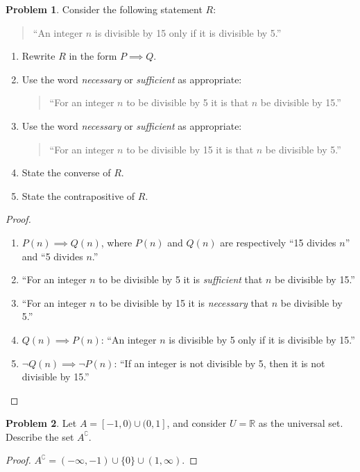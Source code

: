 \documentclass[11pt]{article}
\theoremstyle{definition}
\newtheorem{problem}{Problem}
\begin{document}
\begin{problem}
  Consider the following statement $R$:
  \begin{quote} ``An integer $n$ is divisible by 15 only if it is divisible by 5.'' \end{quote}
  \begin{enumerate}
  \item Rewrite $R$ in the form $P \implies Q$.
  \item Use the word \emph{necessary} or \emph{sufficient} as appropriate:
    \begin{quote}
      ``For an integer $n$ to be divisible by 5 it is \makebox[2cm]{\hrulefill} that $n$ be divisible by 15.''
    \end{quote}
  \item Use the word \emph{necessary} or \emph{sufficient} as appropriate:
    \begin{quote}
      ``For an integer $n$ to be divisible by 15 it is \makebox[2cm]{\hrulefill} that $n$ be divisible by 5.''
    \end{quote}
  \item State the converse of $R$.
  \item State the contrapositive of $R$.
  \end{enumerate}
\end{problem}
\begin{proof}
  \begin{enumerate}
  \item $P(n) \implies Q(n)$, where $P(n)$ and $Q(n)$ are respectively ``15 divides $n$'' and ``5 divides $n$.''
  \item ``For an integer $n$ to be divisible by 5 it is \emph{sufficient} that $n$ be divisible by 15.''
  \item ``For an integer $n$ to be divisible by 15 it is \emph{necessary} that $n$ be divisible by 5.''
  \item $Q(n) \implies P(n)$: ``An integer $n$ is divisible by 5 only if it is divisible by 15.''
  \item $\lnot Q(n) \implies \lnot P(n)$: ``If an integer is not divisible by 5, then it is not divisible by 15.'' \qedhere
  \end{enumerate}
\end{proof}

\begin{problem}
  Let $A = [-1,0) \cup (0,1]$, and consider $U=\mathbb{R}$ as the universal set. Describe the set $A^\complement$.
\end{problem}
\begin{proof}
  $A^\complement = (-\infty, -1) \cup \{ 0 \} \cup (1, \infty)$.
\end{proof}
\end{document}

